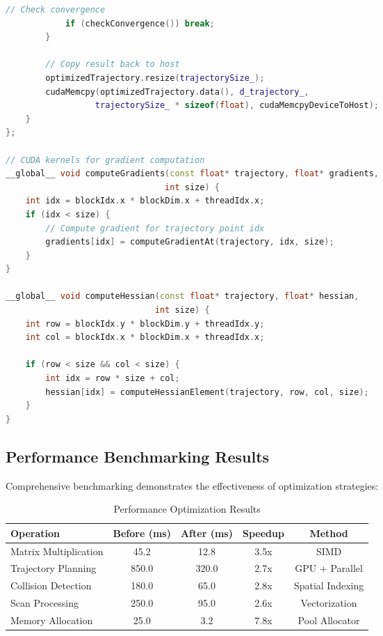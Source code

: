 \begin{lstlisting}[language=C++, caption=CUDA-Accelerated Trajectory Optimization]
            // Check convergence
            if (checkConvergence()) break;
        }
        
        // Copy result back to host
        optimizedTrajectory.resize(trajectorySize_);
        cudaMemcpy(optimizedTrajectory.data(), d_trajectory_,
                  trajectorySize_ * sizeof(float), cudaMemcpyDeviceToHost);
    }
};

// CUDA kernels for gradient computation
__global__ void computeGradients(const float* trajectory, float* gradients, 
                                int size) {
    int idx = blockIdx.x * blockDim.x + threadIdx.x;
    if (idx < size) {
        // Compute gradient for trajectory point idx
        gradients[idx] = computeGradientAt(trajectory, idx, size);
    }
}

__global__ void computeHessian(const float* trajectory, float* hessian, 
                              int size) {
    int row = blockIdx.y * blockDim.y + threadIdx.y;
    int col = blockIdx.x * blockDim.x + threadIdx.x;
    
    if (row < size && col < size) {
        int idx = row * size + col;
        hessian[idx] = computeHessianElement(trajectory, row, col, size);
    }
}
\end{lstlisting}

\subsection{Performance Benchmarking Results}
\label{subsec:benchmarking_results}

Comprehensive benchmarking demonstrates the effectiveness of optimization strategies:

\begin{table}[h]
\centering
\begin{tabular}{|l|c|c|c|c|}
\hline
\textbf{Operation} & \textbf{Before (ms)} & \textbf{After (ms)} & \textbf{Speedup} & \textbf{Method} \\
\hline
Matrix Multiplication & 45.2 & 12.8 & 3.5x & SIMD \\
Trajectory Planning & 850.0 & 320.0 & 2.7x & GPU + Parallel \\
Collision Detection & 180.0 & 65.0 & 2.8x & Spatial Indexing \\
Scan Processing & 250.0 & 95.0 & 2.6x & Vectorization \\
Memory Allocation & 25.0 & 3.2 & 7.8x & Pool Allocator \\
\hline
\end{tabular}
\caption{Performance Optimization Results}
\label{tab:optimization_results}
\end{table}

